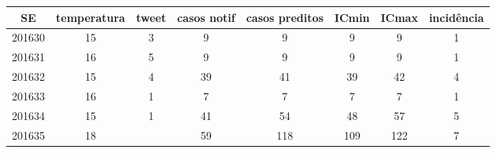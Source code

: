 \begin{tabular}{c|ccccccc}
  \hline
SE & temperatura & tweet & casos notif & casos preditos & ICmin & ICmax & incidência \\ 
  \hline
201630 & 15 & 3 & 9 & 9 & 9 & 9 & 1 \\ 
  201631 & 16 & 5 & 9 & 9 & 9 & 9 & 1 \\ 
  201632 & 15 & 4 & 39 & 41 & 39 & 42 & 4 \\ 
  201633 & 16 & 1 & 7 & 7 & 7 & 7 & 1 \\ 
  201634 & 15 & 1 & 41 & 54 & 48 & 57 & 5 \\ 
  201635 & 18 &  & 59 & 118 & 109 & 122 & 7 \\ 
   \hline
\end{tabular}

